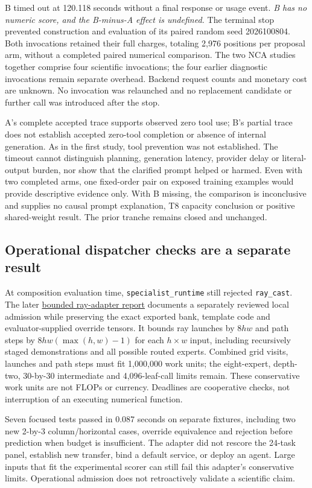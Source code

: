 \documentclass[11pt]{article}
\begin{document}
B timed out at 120.118 seconds without a final response or usage event.
\emph{B has no numeric score, and the B-minus-A effect is undefined.} The
terminal stop prevented construction and evaluation of its paired random seed
2026100804. Both invocations retained their full charges, totaling 2{,}976
positions per proposal arm, without a completed paired numerical comparison.
The two NCA studies together comprise four scientific invocations; the four
earlier diagnostic invocations remain separate overhead. Backend request counts
and monetary cost are unknown. No invocation was relaunched and no replacement
candidate or further call was introduced after the stop.

A's complete accepted trace supports observed zero tool use; B's partial trace
does not establish accepted zero-tool completion or absence of internal
generation. As in the first study, tool prevention was not established.
The timeout cannot distinguish planning, generation latency, provider delay
or literal-output burden, nor show that the clarified prompt helped or harmed.
Even with two completed arms, one fixed-order pair on exposed training examples
would provide descriptive evidence only. With B missing, the comparison is
inconclusive and supplies no causal prompt explanation, T8 capacity conclusion
or positive shared-weight result. The prior tranche remains closed and unchanged.

\subsection{Operational dispatcher checks are a separate result}
At composition evaluation time, \texttt{specialist\_runtime} still rejected \texttt{ray\_cast}.
The later \href{https://github.com/Sanokei/CellForge/blob/02beaf18251fca5ed1f1eb55e92f00a3e3820e88/docs/SPECIALIST_RAY_ADAPTER.md}{bounded ray-adapter report} documents a
separately reviewed local admission while preserving the exact exported bank, template code
and evaluator-supplied override tensors. It bounds ray launches by $8hw$ and path steps by
$8hw(\max(h,w)-1)$ for each $h\times w$ input, including recursively staged demonstrations and
all possible routed experts. Combined grid visits, launches and path steps must fit 1{,}000{,}000
work units; the eight-expert, depth-two, 30-by-30 intermediate and 4{,}096-leaf-call limits remain.
These conservative work units are not FLOPs or currency. Deadlines are cooperative checks,
not interruption of an executing numerical function.

Seven focused tests passed in 0.087 seconds on separate fixtures, including two new 2-by-3
column/horizontal cases, override equivalence and rejection before prediction when budget is
insufficient. The adapter did not rescore the 24-task panel, establish new transfer, bind a
default service, or deploy an agent. Large inputs that fit the experimental scorer can still
fail this adapter's conservative limits. Operational admission does not retroactively validate
a scientific claim.
\end{document}
